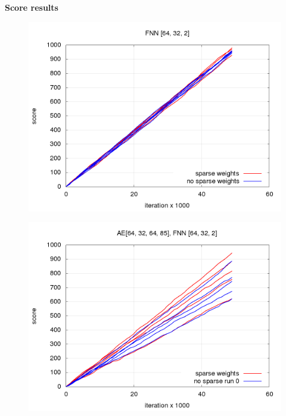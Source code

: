 \documentclass[xcolor=dvipsnames]{beamer}
\begin{document}
\begin{frame}{\bf Score results}
\begin{figure}[!htb]
\centering
\begin{minipage}{.5\textwidth}
  \centering
  \includegraphics[scale=0.15]{../../results/rl_arcade/fnn_progress/testing_score.png}
  \label{img:FNN score}
\end{minipage}%
\begin{minipage}{.5\textwidth}
  \centering
  \includegraphics[scale=0.15]{../../results/rl_arcade/hnn_progress/testing_score.png}
  \label{img:AE+FNN score}
\end{minipage}
\end{figure}


\end{frame}
\end{document}

